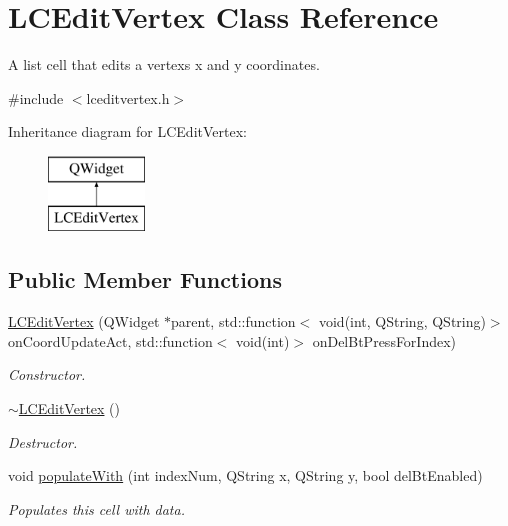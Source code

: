 \hypertarget{class_l_c_edit_vertex}{}\section{L\+C\+Edit\+Vertex Class Reference}
\label{class_l_c_edit_vertex}


A list cell that edits a vertex\textquotesingle{}s x and y coordinates.  




{\ttfamily \#include $<$lceditvertex.\+h$>$}

Inheritance diagram for L\+C\+Edit\+Vertex\+:\begin{figure}[H]
\begin{center}
\leavevmode
\includegraphics[height=2.000000cm]{class_l_c_edit_vertex}
\end{center}
\end{figure}
\subsection*{Public Member Functions}
\begin{DoxyCompactItemize}
\item 
\mbox{\hyperlink{class_l_c_edit_vertex_a91308e9570ce130c5eeed30679788f9f}{L\+C\+Edit\+Vertex}} (Q\+Widget $\ast$parent, std\+::function$<$ void(int, Q\+String, Q\+String)$>$ on\+Coord\+Update\+Act, std\+::function$<$ void(int)$>$ on\+Del\+Bt\+Press\+For\+Index)
\begin{DoxyCompactList}\small\item\em Constructor. \end{DoxyCompactList}\item 
\mbox{\label{class_l_c_edit_vertex_afa2b6af39e75885099b07ad550032708}} 
\mbox{\hyperlink{class_l_c_edit_vertex_afa2b6af39e75885099b07ad550032708}{$\sim$\+L\+C\+Edit\+Vertex}} ()
\begin{DoxyCompactList}\small\item\em Destructor. \end{DoxyCompactList}\item 
void \mbox{\hyperlink{class_l_c_edit_vertex_a2e2c193ce93d858f79897a162f5c9e23}{populate\+With}} (int index\+Num, Q\+String x, Q\+String y, bool del\+Bt\+Enabled)
\begin{DoxyCompactList}\small\item\em Populates this cell with data. \end{DoxyCompactList}\end{DoxyCompactItemize}


